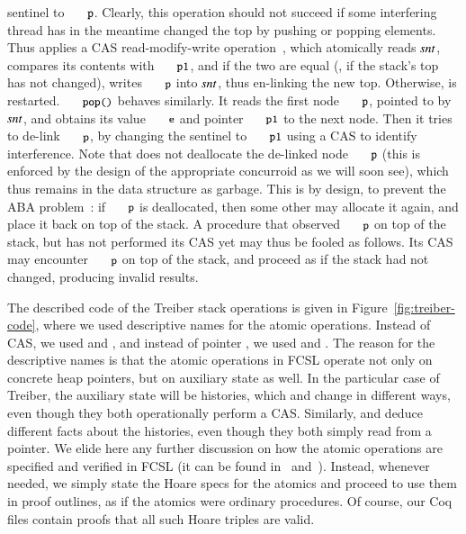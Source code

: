 sentinel to $\eesc{p}$. Clearly, this operation should not succeed if
some interfering thread has in the meantime changed the top by pushing
or popping elements. Thus  applies a CAS read-modify-write
operation~\cite{Herlihy-Shavit:08}, which atomically reads $\mathit{snt}$,
compares its contents with $\eesc{p1}$, and if the two are equal (\ie,
if the stack's top has not changed), writes $\eesc{p}$ into $\mathit{snt}$,
thus en-linking the new top. Otherwise,  is restarted.
%
$\code{pop()}$ behaves similarly. It reads the first node $\code{p}$,
pointed to by $\mathit{snt}$, and obtains its value $\eesc{e}$ and pointer
$\eesc{p1}$ to the next node. Then it tries to de-link $\code{p}$, by
changing the sentinel to $\eesc{p1}$ using a CAS to identify
interference. Note that  does not deallocate the de-linked
node $\eesc{p}$ (this is enforced by the design of the appropriate
concurroid as we will soon see), which thus remains in the data
structure as garbage. This is by design, to prevent the ABA
problem~\cite[\S10]{Herlihy-Shavit:08}: if $\eesc{p}$ is deallocated,
then some other  may allocate it again, and place it back
on top of the stack. A procedure that observed $\eesc{p}$ on top of
the stack, but has not performed its CAS yet may thus be fooled as
follows. Its CAS may encounter $\eesc{p}$ on top of the stack, and
proceed as if the stack had not changed, producing invalid results.

The described code of the Treiber stack operations is given in
Figure~\ref{fig:treiber-code}, where we used descriptive names for the
atomic operations. Instead of CAS, we used  and
, and instead of pointer , we used
 and . The reason for the
descriptive names is that the atomic operations in FCSL operate not
only on concrete heap pointers, but on auxiliary state as well. In the
particular case of Treiber, the auxiliary state will be histories,
which  and  change in different ways, even
though they both operationally perform a CAS. Similarly,
 and  deduce different facts about
the histories, even though they both simply read from a pointer.
%
We elide here any further discussion on how the atomic operations are
specified and verified in FCSL (it can be found
in~\cite{Nanevski-al:ESOP14}
and~\cite[Appendix~C]{Sergey-al:ESOP15ext}). Instead, whenever needed,
we simply state the Hoare specs for the atomics and proceed to use
them in proof outlines, as if the atomics were ordinary procedures. Of
course, our Coq files contain proofs that all such Hoare triples are
valid.

